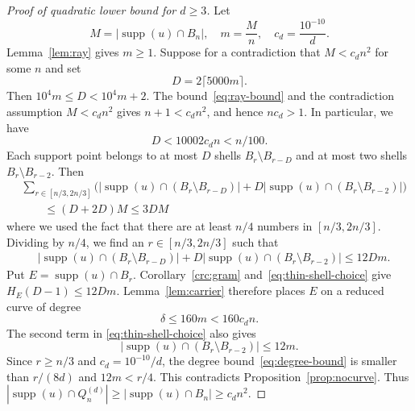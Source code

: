 \documentclass[11pt,reqno]{amsart}
\newcommand{\supp}{\operatorname{supp}}
\theoremstyle{definition}
\theoremstyle{plain}
\numberwithin{equation}{section}
\begin{document}
\medskip
\begin{proof}[Proof of quadratic lower bound for $d\ge 3$]
    Let 
    \begin{equation*}
        M=|\supp(u)\cap B_n|,
 \quad m=\frac Mn,
 \quad c_d=\frac{10^{-10}}d.
    \end{equation*}
    Lemma~\ref{lem:ray} gives $m\ge 1$. Suppose for a contradiction that $M<c_d n^2$ for some $n$ and set
    \begin{equation*}
        D=2\lceil 5000m\rceil.
    \end{equation*}
    Then $10^4m\le D<10^4m+2$. The bound~\eqref{eq:ray-bound} and the contradiction assumption $M<c_dn^2$ gives $n+1<c_d n^2$, and hence $nc_d>1$. In particular, we have
    \begin{equation*}
        D<10002c_d n<n/100.
    \end{equation*}
     Each support point belongs to at most $D$ shells $B_r\setminus B_{r-D}$ and at most two shells $B_r\setminus B_{r-2}$. Then
\begin{align*}
 &\sum_{r\in [n/3,2n/3]}\bigl(
 |\supp(u)\cap(B_r\setminus B_{r-D})|
 +D|\supp(u)\cap(B_r\setminus B_{r-2})|\bigr)\\
 &\qquad\le(D+2D)M\le3DM
\end{align*}
where we used the fact that there are at least $n/4$ numbers in $[n/3,2n/3]$.
Dividing by $n/4$, we find an $r\in [n/3,2n/3]$ such that
\begin{align}\label{eq:thin-shell-choice}
 &|\supp(u)\cap(B_r\setminus B_{r-D})|
 +D|\supp(u)\cap(B_r\setminus B_{r-2})|
 \le12Dm.
\end{align}
Put $E=\supp(u)\cap B_r$. Corollary~\ref{crc:gram} and~\eqref{eq:thin-shell-choice} give $H_E(D-1)\le 12 Dm$. Lemma~\ref{lem:carrier} therefore places $E$ on a reduced curve of degree
\begin{equation}\label{eq:degree-bound}
    \delta \le 160m<160c_dn.
\end{equation}
The second term in \eqref{eq:thin-shell-choice} also gives
\begin{equation*}
    |\supp(u)\cap(B_r\setminus B_{r-2})|\le12m.
\end{equation*}
Since $r\ge n/3$ and $c_d=10^{-10}/d$, the degree bound~\eqref{eq:degree-bound} is smaller than $r/(8d)$ and $12m<r/4$. This contradicts Proposition~\ref{prop:nocurve}. Thus $|\supp(u)\cap Q_n^{(d)}|\ge |\supp(u)\cap B_n|\ge c_dn^2$.
\end{proof}
\end{document}
